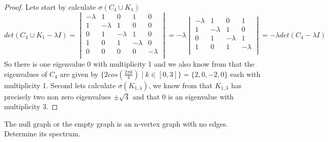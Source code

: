 \documentclass[a4paper, 11pt, oneside]{article}
\newenvironment{problem}[1]
  {\renewcommand\theinnercustomprob{#1}\innercustomprob}
  {\endinnercustomprob}
\begin{document}
\begin{proof}
Lets start by calculate $\sigma(C_4\cup K_1)$
\begin{equation*}
det (C_4\cup K_1 - \lambda I) =
\begin{vmatrix}
-\lambda & 1             & 0             & 1                        & 0 \\ 
1             & -\lambda & 1             & 0                         & 0 \\ 
0             & 1             & -\lambda & 1                         & 0 \\ 
1             & 0             & 1             & -\lambda             & 0 \\ 
0             & 0             & 0             & 0                         & -\lambda \\ 
\end{vmatrix} =
-\lambda
\begin{vmatrix}
-\lambda & 1             & 0             & 1                         \\ 
1             & -\lambda & 1             & 0                          \\ 
0             & 1             & -\lambda & 1                          \\ 
1             & 0             & 1             & -\lambda             \\ 
\end{vmatrix} =-\lambda  det (C_4 - \lambda I)
\end{equation*}
So there is one eigenvalue 0 with multiplicity 1 and we also know from \cite[Example 7]{adjacency_matrix}  that the eigenvalues of $C_4$ are given by $\{2cos(\frac{2\pi k}{4}) \mid k \in [0, 3]\} = \{ 2, 0, -2, 0 \}$ each with multiplicity 1.
Second lets calculate $\sigma(K_{1,4})$, we know from \cite[Example 9]{adjacency_matrix} that $K_{1,3}$ has precisely two non zero eigenvalues $\pm \sqrt{4}$ and that 0 is an eigenvalue with multiplicity 3.
\end{proof}

\begin{problem}{2.2.1}\label{problem2.2.1}
The null graph or the empty graph is an n-vertex graph with no edges. Determine its spectrum.
\end{problem}
\end{document}
